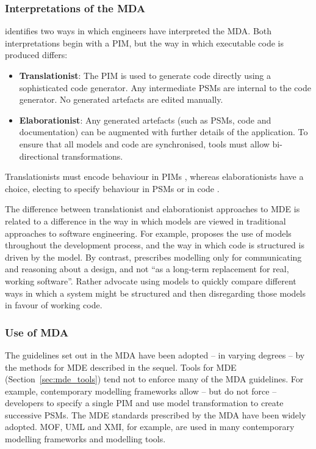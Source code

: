\subsubsection{Interpretations of the MDA}
\cite{mcneile03mda} identifies two ways in which engineers have interpreted the MDA. Both interpretations begin with a PIM, but the way in which executable code is produced differs:

\begin{itemize}
 \item \textbf{Translationist}: The PIM is used to generate code directly using a sophisticated code generator. Any intermediate PSMs are internal to the code generator. No generated artefacts are edited manually.
 \item \textbf{Elaborationist}: Any generated artefacts (such as PSMs, code and documentation) can be augmented with further details of the application. To ensure that all models and code are synchronised, tools must allow bi-directional transformations.
\end{itemize}

Translationists must encode behaviour in PIMs \cite{mellor02executable}, whereas elaborationists have a choice, electing to specify behaviour in PSMs or in code \cite{kleppe03mda}.

The difference between translationist and elaborationist approaches to MDE is related to a difference in the way in which models are viewed in traditional approaches to software engineering. For example, \cite{evans04domain} proposes the use of models throughout the development process, and the way in which code is structured is driven by the model. By contrast, \cite[ch. 14]{martin06agile} prescribes modelling only for communicating and reasoning about a design, and not ``as a long-term replacement for real, working software''. Rather \cite{martin06agile} advocate using models to quickly compare different ways in which a system might be structured and then disregarding those models in favour of working code.

\subsubsection{Use of MDA}
The guidelines set out in the MDA have been adopted -- in varying degrees -- by the methods for MDE described in the sequel. Tools for MDE (Section~\ref{sec:mde_tools}) tend not to enforce many of the MDA guidelines. For example, contemporary modelling frameworks allow -- but do not force -- developers to specify a single PIM and use model transformation to create successive PSMs. The MDE standards prescribed by the MDA have been widely adopted. MOF, UML and XMI, for example, are used in many contemporary modelling frameworks and modelling tools. 

